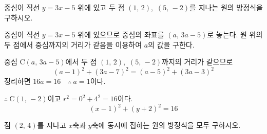 \documentclass[10pt]{article}
\begin{document}
\newpage


\begin{dmproblem}
중심이 직선 $y = 3x - 5$ 위에 있고 두 점 $(1,\, 2)$,\ $(5,\, -2)$를 지나는 원의 방정식을 구하시오.
\end{dmproblem}

\begin{dmapproach}
중심이 직선 $y = 3x - 5$ 위에 있으므로 중심의 좌표를 $(a,\, 3a - 5)$로 놓는다. 원 위의 두 점에서 중심까지의 거리가 같음을 이용하여 $a$의 값을 구한다.
\end{dmapproach}

\begin{dmsolution}
중심 $\mathrm{C}(a,\, 3a - 5)$에서 두 점 $(1,\, 2)$,\ $(5,\, -2)$까지의 거리가 같으므로
\begin{equation*}
  (a - 1)^2 + (3a - 7)^2 = (a - 5)^2 + (3a - 3)^2
\end{equation*}
정리하면 $16a = 16 \quad \therefore\ a = 1$이다.

$\therefore\ \mathrm{C}(1,\, -2)$이고 $r^2 = 0^2 + 4^2 = 16$이다.
\begin{equation*}
  (x - 1)^2 + (y + 2)^2 = 16
\end{equation*}
\end{dmsolution}

\dmchecktitle



\newpage


\begin{dmproblem}
점 $(2,\, 4)$를 지나고 $x$축과 $y$축에 동시에 접하는 원의 방정식을 모두 구하시오.
\end{dmproblem}
\end{document}
